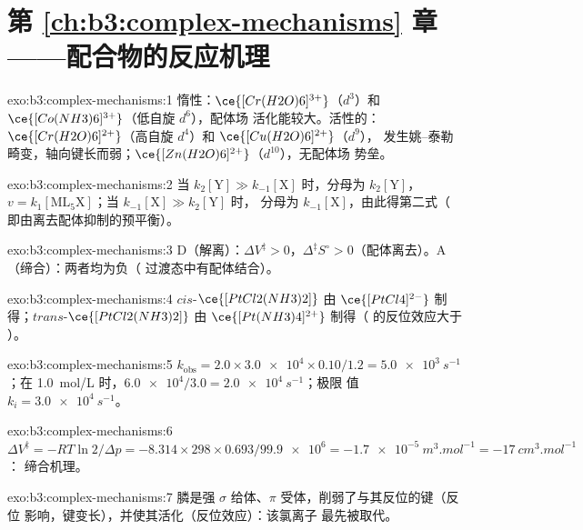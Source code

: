 \section*{第 \ref{ch:b3:complex-mechanisms} 章——配合物的反应机理}

\begin{solution}{exo:b3:complex-mechanisms:1}
惰性：$\ce{[Cr(H2O)6]^{3+}}$（$d^3$）和 $\ce{[Co(NH3)6]^{3+}}$（低自旋 $d^6$），配体场
活化能较大。活性的：$\ce{[Cr(H2O)6]^{2+}}$（高自旋 $d^4$）和 $\ce{[Cu(H2O)6]^{2+}}$（$d^9$），
发生姚–泰勒畸变，轴向键长而弱；$\ce{[Zn(H2O)6]^{2+}}$（$d^{10}$），无配体场
势垒。
\end{solution}

\begin{solution}{exo:b3:complex-mechanisms:2}
当 $k_2[\mathrm Y] \gg k_{-1}[\mathrm X]$ 时，分母为 $k_2[\mathrm Y]$，$v = k_1[\mathrm{ML_5X}]$；当 $k_{-1}[\mathrm X] \gg k_2[\mathrm Y]$ 时，
分母为 $k_{-1}[\mathrm X]$，由此得第二式（
即由离去配体抑制的预平衡）。
\end{solution}

\begin{solution}{exo:b3:complex-mechanisms:3}
D（解离）：$\Delta V^{\ddagger} > 0$，$\Delta^{\ddagger}S^\circ > 0$（配体离去）。A（缔合）：两者均为负（
过渡态中有配体结合）。
\end{solution}

\begin{solution}{exo:b3:complex-mechanisms:4}
$cis$-$\ce{[PtCl2(NH3)2]}$ 由 $\ce{[PtCl4]^{2-}}$ 制得；$trans$-$\ce{[PtCl2(NH3)2]}$ 由 $\ce{[Pt(NH3)4]^{2+}}$ 制得（
 的反位效应大于 ）。
\end{solution}

\begin{solution}{exo:b3:complex-mechanisms:5}
$k_{\mathrm{obs}} = 2.0 \times \num{3.0e4} \times 0.10/1.2 = \qty{5.0e3}{s^{-1}}$；在 \qty{1.0}{mol/L} 时，$\num{6.0e4}/3.0 = \qty{2.0e4}{s^{-1}}$；极限
值 $k_i = \qty{3.0e4}{s^{-1}}$。
\end{solution}

\begin{solution}{exo:b3:complex-mechanisms:6}
$\Delta V^{\ddagger} = -RT\ln2/\Delta p = -8.314 \times 298 \times 0.693/\num{99.9e6} = \qty{-1.7e-5}{m^3.mol^{-1}} = \qty{-17}{cm^3.mol^{-1}}$：
缔合机理。
\end{solution}

\begin{solution}{exo:b3:complex-mechanisms:7}
膦是强 $\sigma$ 给体、$\pi$ 受体，削弱了与其反位的键（反位
影响，键变长），并使其活化（反位效应）：该氯离子
最先被取代。
\end{solution}

